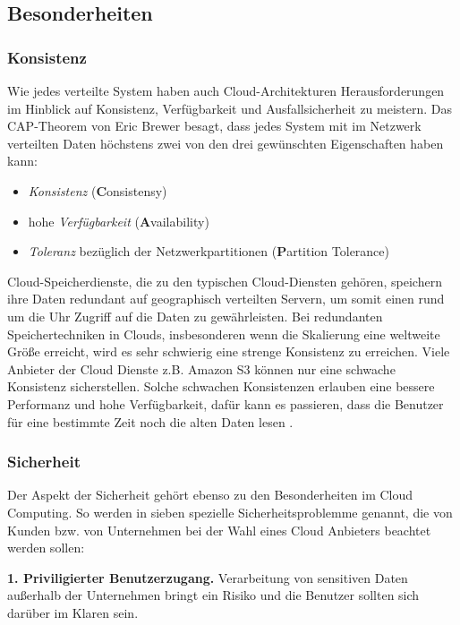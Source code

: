 \subsection{Besonderheiten}
\subsubsection{Konsistenz}
Wie jedes verteilte System haben auch Cloud-Architekturen Herausforderungen im Hinblick auf Konsistenz, Verfügbarkeit und Ausfallsicherheit zu meistern.
Das CAP-Theorem\cite{CAP} von Eric Brewer besagt, dass jedes System mit im Netzwerk verteilten Daten höchstens zwei von den drei gewünschten Eigenschaften haben kann:
\begin{itemize}
	\item \textit{Konsistenz} (\textbf{C}onsistensy)
	\item hohe \textit{Verfügbarkeit} (\textbf{A}vailability)
	\item \textit{Toleranz} bezüglich der Netzwerkpartitionen (\textbf{P}artition Tolerance)
\end{itemize}

Cloud-Speicherdienste, die zu den typischen Cloud-Diensten gehören, speichern ihre Daten redundant auf geographisch verteilten Servern, um somit einen rund um die Uhr Zugriff auf die Daten zu gewährleisten.
Bei redundanten Speichertechniken in Clouds, insbesonderen wenn die Skalierung eine weltweite Größe erreicht, wird es sehr schwierig eine strenge Konsistenz zu erreichen. Viele Anbieter der Cloud Dienste z.B. Amazon S3 können nur eine schwache Konsistenz
sicherstellen. Solche schwachen Konsistenzen erlauben eine bessere Performanz und hohe Verfügbarkeit, dafür kann es passieren, dass die Benutzer für eine bestimmte Zeit noch die alten Daten lesen \cite{consistency-as-a-service}.

\subsubsection{Sicherheit}
Der Aspekt der Sicherheit gehört ebenso zu den Besonderheiten im Cloud Computing. So werden in \cite{seven-seq-risks} sieben spezielle Sicherheitsproblemme genannt, die von Kunden bzw. von Unternehmen bei der Wahl eines Cloud Anbieters beachtet werden sollen:

\textbf{1. Priviligierter Benutzerzugang.} Verarbeitung von sensitiven Daten außerhalb der Unternehmen bringt ein Risiko und die Benutzer sollten sich darüber im Klaren sein.


